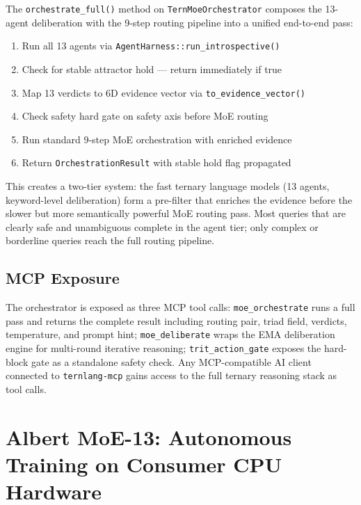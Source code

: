 \documentclass[11pt,a4paper]{article}
\begin{document}
The \texttt{orchestrate\_full()} method on \texttt{TernMoeOrchestrator}
composes the 13-agent deliberation with the 9-step routing pipeline into a
unified end-to-end pass:

\begin{enumerate}
  \item Run all 13 agents via \texttt{AgentHarness::run\_introspective()}
  \item Check for stable attractor hold — return immediately if true
  \item Map 13 verdicts to 6D evidence vector via \texttt{to\_evidence\_vector()}
  \item Check safety hard gate on safety axis before MoE routing
  \item Run standard 9-step MoE orchestration with enriched evidence
  \item Return \texttt{OrchestrationResult} with stable hold flag propagated
\end{enumerate}

This creates a two-tier system: the fast ternary language models (13 agents,
keyword-level deliberation) form a pre-filter that enriches the evidence
before the slower but more semantically powerful MoE routing pass. Most
queries that are clearly safe and unambiguous complete in the agent tier;
only complex or borderline queries reach the full routing pipeline.

\subsection{MCP Exposure}

The orchestrator is exposed as three MCP tool calls:
\texttt{moe\_orchestrate} runs a full pass and returns the complete result
including routing pair, triad field, verdicts, temperature, and prompt hint;
\texttt{moe\_deliberate} wraps the EMA deliberation engine for multi-round
iterative reasoning; \texttt{trit\_action\_gate} exposes the hard-block gate
as a standalone safety check. Any MCP-compatible AI client connected to
\texttt{ternlang-mcp} gains access to the full ternary reasoning stack as
tool calls.

\section{Albert MoE-13: Autonomous Training on Consumer CPU Hardware}
\label{sec:albert}
\end{document}
